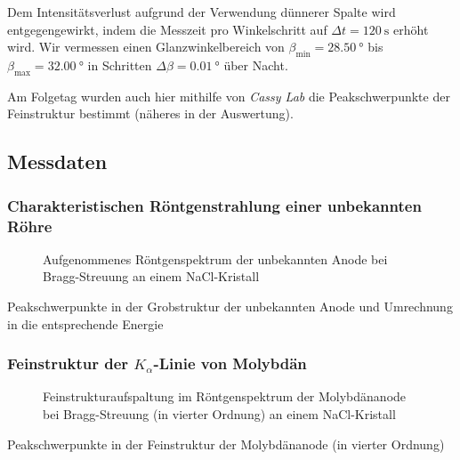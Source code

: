 \documentclass[11pt, a4paper]{article}
\begin{document}
Dem Intensitätsverlust aufgrund der Verwendung dünnerer Spalte wird entgegengewirkt, indem die Messzeit pro Winkelschritt auf $\Delta t = \SI{120}{\second}$ erhöht wird.
Wir vermessen einen Glanzwinkelbereich von $\beta_\mathrm{min} = \SI{28,50}{\degree}$ bis $\beta_\mathrm{max} = \SI{32,00}{\degree}$ in Schritten $\Delta \beta = \SI{0,01}{\degree}$ über Nacht.

Am Folgetag wurden auch hier mithilfe von \emph{Cassy Lab} die Peakschwerpunkte der Feinstruktur bestimmt (näheres in der Auswertung).

\subsection{Messdaten}
\subsubsection{Charakteristischen Röntgenstrahlung einer unbekannten Röhre}


\begin{figure}[!h]
\centering
\resizebox{\columnwidth}{!}{%
}
\caption{Aufgenommenes Röntgenspektrum der unbekannten Anode bei Bragg-Streuung an einem NaCl-Kristall}
\label{fig:anode3}
\end{figure}

\begin{table}[!h]
\centering

\caption{Peakschwerpunkte in der Grobstruktur der unbekannten Anode und Umrechnung in die entsprechende Energie}
\label{tab:peakschwerpunkt_grobstruktur}
\end{table}

\subsubsection{Feinstruktur der $K_\alpha$-Linie von Molybdän}

\begin{figure}[!h]
\centering
\resizebox{\columnwidth}{!}{%
}
\caption{Feinstrukturaufspaltung im Röntgenspektrum der Molybdänanode bei Bragg-Streuung (in vierter Ordnung) an einem NaCl-Kristall}
\label{fig:feinstruktur}
\end{figure}

\begin{table}[!h]
\centering

\caption{Peakschwerpunkte in der Feinstruktur der Molybdänanode (in vierter Ordnung)}
\label{tab:peakschwerpunkt_feinstruktur}
\end{table}
\end{document}

